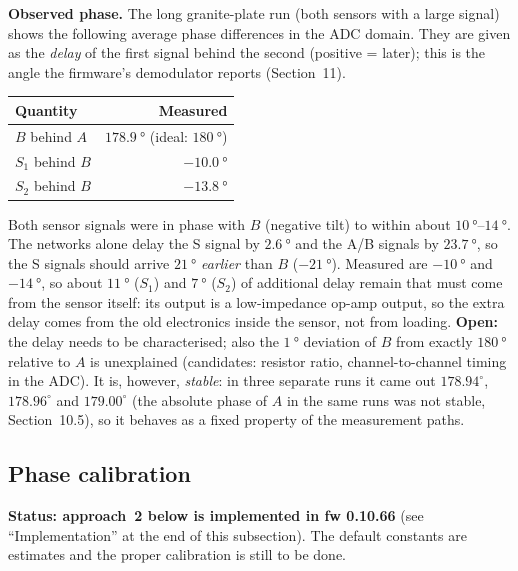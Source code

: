 \documentclass[11pt,a4paper]{article}
\begin{document}
\textbf{Observed phase.}  The long granite-plate run (both sensors with a
large signal) shows the following average phase differences in the ADC
domain.  They are given as the \emph{delay} of the first signal behind the
second (positive = later); this is the angle the firmware's demodulator
reports (Section~11).

\begin{center}
\begin{tabular}{@{}lr@{}}
\toprule
Quantity & Measured \\
\midrule
$B$ behind $A$                   & $\SI{178.9}{\degree}$ (ideal: $\SI{180}{\degree}$) \\
$S_1$ behind $B$                 & $\SI{-10.0}{\degree}$ \\
$S_2$ behind $B$                 & $\SI{-13.8}{\degree}$ \\
\bottomrule
\end{tabular}
\end{center}

Both sensor signals were in phase with $B$ (negative tilt) to within about
$\SI{10}{\degree}$--$\SI{14}{\degree}$.  The networks alone delay the S
signal by $\SI{2.6}{\degree}$ and the A/B signals by $\SI{23.7}{\degree}$,
so the S signals should arrive $\SI{21}{\degree}$ \emph{earlier} than $B$
($-\SI{21}{\degree}$).  Measured are $-\SI{10}{\degree}$ and
$-\SI{14}{\degree}$, so about $\SI{+11}{\degree}$ ($S_1$) and
$\SI{+7}{\degree}$ ($S_2$) of additional delay remain that must come from
the sensor itself: its output is a low-impedance op-amp output, so the extra
delay comes from the old electronics inside the sensor, not from loading.
\textbf{Open:} the delay needs to be characterised; also the
$\SI{1}{\degree}$ deviation of $B$ from exactly $\SI{180}{\degree}$ relative
to $A$ is unexplained (candidates: resistor ratio, channel-to-channel timing
in the ADC).  It is, however, \emph{stable}: in three separate runs it came out
$178.94^{\circ}$, $178.96^{\circ}$ and $179.00^{\circ}$ (the absolute phase of $A$
in the same runs was not stable, Section~10.5), so it behaves as a fixed property
of the measurement paths.

\subsection{Phase calibration}
\label{sec:phasecal}

\textbf{Status: approach~2 below is implemented in fw 0.10.66} (see
``Implementation'' at the end of this subsection).  The default constants are
estimates and the proper calibration is still to be done.
\end{document}

